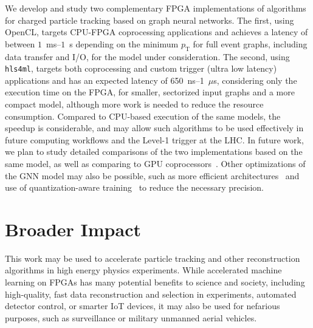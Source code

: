 \documentclass{article}
\newcommand{\hlsfml}{\texttt{hls4ml}\xspace}
\newcommand{\pt}{\ensuremath{p_{\mathrm{T}}}\xspace}
\begin{document}
We develop and study two complementary FPGA implementations of algorithms for charged particle tracking based on graph neural networks. 
The first, using OpenCL, targets CPU-FPGA coprocessing applications and achieves a latency of between $1$~ms--$1$~s depending on the minimum $\pt$ for full event graphs, including data transfer and I/O, for the model under consideration.
The second, using \hlsfml, targets both coprocessing and custom trigger (ultra low latency) applications and has an expected latency of 650~ns--1~$\mu$s, considering only the execution time on the FPGA, for smaller, sectorized input graphs and a more compact model, although more work is needed to reduce the resource consumption.
Compared to CPU-based execution of the same models, the speedup is considerable, and may allow such algorithms to be used effectively in future computing workflows and the Level-1 trigger at the LHC.
In future work, we plan to study detailed comparisons of the two implementations based on the same model, as well as comparing to GPU coprocessors~\cite{Krupa:2020bwg}.
Other optimizations of the GNN model may also be possible, such as more efficient architectures~\cite{Iiyama:2020wap} and use of quantization-aware training~\cite{DiGuglielmo:2020eqx,Coelho:2020zfu} to reduce the necessary precision.

\section*{Broader Impact}

This work may be used to accelerate particle tracking and other reconstruction algorithms in high energy physics experiments.
While accelerated machine learning on FPGAs has many potential benefits to science and society, including high-quality, fast data reconstruction and selection in experiments, automated detector control, or smarter IoT devices, it may also be used for nefarious purposes, such as surveillance or military unmanned aerial vehicles.
\end{document}
